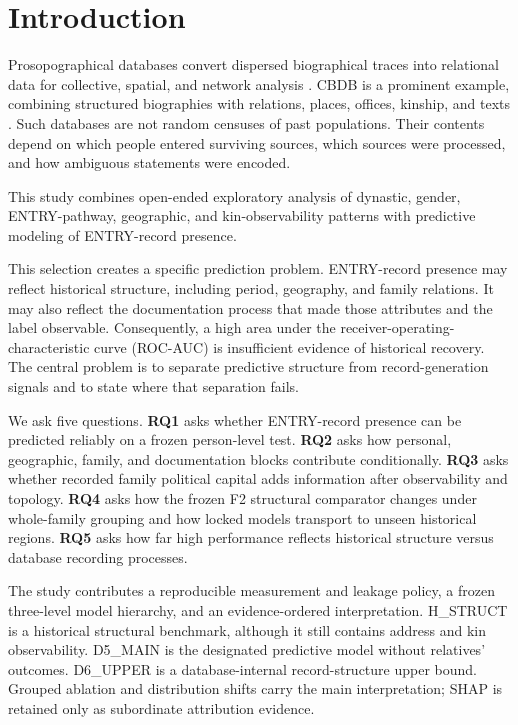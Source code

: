 \documentclass[sigconf]{acmart}
\begin{document}
\section{Introduction}
Prosopographical databases convert dispersed biographical traces into relational data for collective, spatial, and network analysis \cite{bol2012gis,fullerwang2021networks,chenwang2022cbdb}. CBDB is a prominent example, combining structured biographies with relations, places, offices, kinship, and texts \cite{cbdb2026,fuller2024,tsui2020harvesting}. Such databases are not random censuses of past populations. Their contents depend on which people entered surviving sources, which sources were processed, and how ambiguous statements were encoded.

This study combines open-ended exploratory analysis of dynastic, gender, ENTRY-pathway, geographic, and kin-observability patterns with predictive modeling of ENTRY-record presence.

This selection creates a specific prediction problem. ENTRY-record presence may reflect historical structure, including period, geography, and family relations. It may also reflect the documentation process that made those attributes and the label observable. Consequently, a high area under the receiver-operating-characteristic curve (ROC-AUC) is insufficient evidence of historical recovery. The central problem is to separate predictive structure from record-generation signals and to state where that separation fails.

We ask five questions. \textbf{RQ1} asks whether ENTRY-record presence can be predicted reliably on a frozen person-level test. \textbf{RQ2} asks how personal, geographic, family, and documentation blocks contribute conditionally. \textbf{RQ3} asks whether recorded family political capital adds information after observability and topology. \textbf{RQ4} asks how the frozen F2 structural comparator changes under whole-family grouping and how locked models transport to unseen historical regions. \textbf{RQ5} asks how far high performance reflects historical structure versus database recording processes.

The study contributes a reproducible measurement and leakage policy, a frozen three-level model hierarchy, and an evidence-ordered interpretation. H\_STRUCT is a historical structural benchmark, although it still contains address and kin observability. D5\_MAIN is the designated predictive model without relatives' outcomes. D6\_UPPER is a database-internal record-structure upper bound. Grouped ablation and distribution shifts carry the main interpretation; SHAP is retained only as subordinate attribution evidence.
\end{document}
